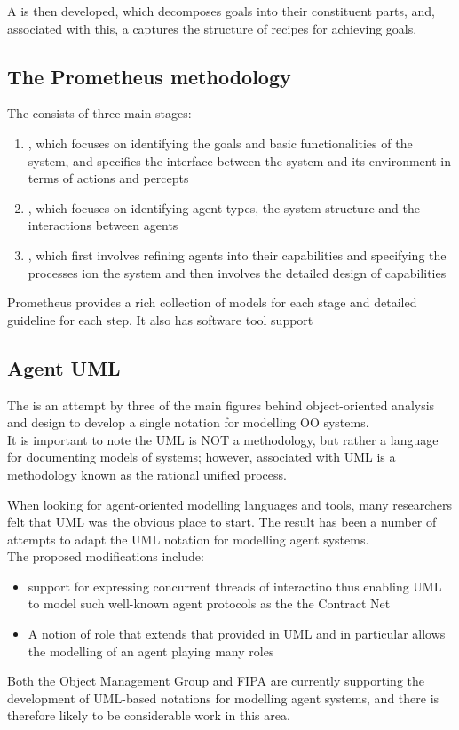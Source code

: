 A  is then developed, which decomposes goals into their constituent parts, and, associated with this, a  captures the structure of recipes for achieving goals.

\subsection{The Prometheus methodology}
The  consists of three main stages:
\begin{enumerate}
\item {}, which focuses on identifying the goals and basic functionalities of the system, and specifies the interface between the system and its environment in terms of actions and percepts
\item {}, which focuses on identifying agent types, the system structure and the interactions between agents
\item {}, which first involves refining agents into their capabilities and specifying the processes ion the system and then involves the detailed design of capabilities
\end{enumerate}
Prometheus provides a rich collection of models for each stage and detailed guideline for each step. It also has software tool support

\subsection{Agent UML}
The  is an attempt by three of the main figures behind object-oriented analysis and design to develop a single notation for modelling OO systems.\\
It is important to note the UML is NOT a methodology, but rather a language for documenting models of systems; however, associated with UML is a methodology known as the rational unified process.

When looking for agent-oriented modelling languages and tools, many researchers felt that UML was the obvious place to start. The result has been a number of attempts to adapt the UML notation for modelling agent systems.\\
The proposed modifications include:
\begin{itemize}
\item support for expressing concurrent threads of interactino thus enabling UML to model such well-known agent protocols as the the Contract Net
\item A notion of role that extends that provided in UML and in particular allows the modelling of an agent playing many roles
\end{itemize}
Both the Object Management Group and FIPA are currently supporting the development of UML-based notations for modelling agent systems, and there is therefore likely to be considerable work in this area.

